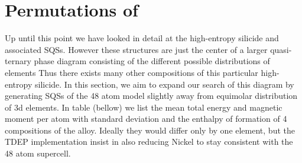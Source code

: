 \chapter{Permutations of }
\label{sec:permutations}

Up until this point we have looked in detail at the high-entropy silicide  and associated SQSs. However these structures are just the center of a larger quasi-ternary phase diagram consisting of the different possible distributions of elements Thus there exists many other compositions of this particular high-entropy silicide. In this section, we aim to expand our search of this diagram by generating SQSs of the 48 atom model slightly away from equimolar distribution of 3d elements. In table (bellow) we list the mean total energy and magnetic moment per atom with standard deviation and the enthalpy of formation of 4 compositions of the  alloy. Ideally they would differ only by one element, but the TDEP implementation insist in also reducing Nickel to stay consistent with the 48 atom supercell. 

